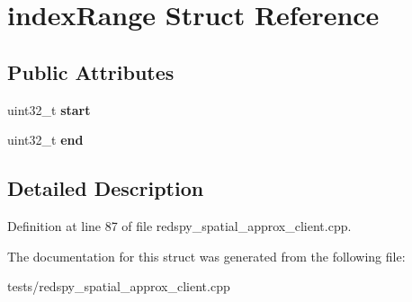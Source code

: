 \hypertarget{structindexRange}{\section{index\-Range Struct Reference}
\label{structindexRange}
}
\subsection*{Public Attributes}
\begin{DoxyCompactItemize}
\item 
\hypertarget{structindexRange_a1b9b8cb4f893759a4eb383a3d6f5b905}{uint32\-\_\-t {\bfseries start}}\label{structindexRange_a1b9b8cb4f893759a4eb383a3d6f5b905}

\item 
\hypertarget{structindexRange_a6a30568c1385892c11fafa80eee97115}{uint32\-\_\-t {\bfseries end}}\label{structindexRange_a6a30568c1385892c11fafa80eee97115}

\end{DoxyCompactItemize}


\subsection{Detailed Description}


Definition at line 87 of file redspy\-\_\-spatial\-\_\-approx\-\_\-client.\-cpp.



The documentation for this struct was generated from the following file\-:\begin{DoxyCompactItemize}
\item 
tests/redspy\-\_\-spatial\-\_\-approx\-\_\-client.\-cpp\end{DoxyCompactItemize}
